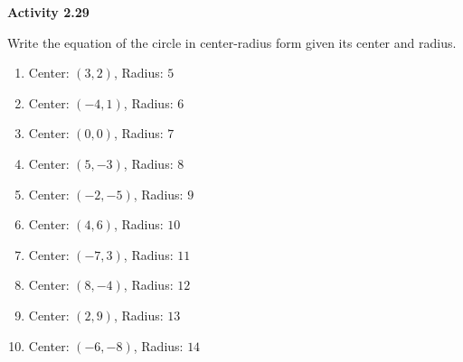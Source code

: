 \vspace{0.3ex}
\noindent\textbf{Activity 2.29}

\vspace{0.2ex}

Write the equation of the circle in center-radius form given its center and radius.
\begin{multicols}{2}
\begin{enumerate}
    \item Center: $(3,2)$, Radius: $5$
    \item Center: $(-4,1)$, Radius: $6$
    \item Center: $(0,0)$, Radius: $7$
    \item Center: $(5,-3)$, Radius: $8$
    \item Center: $(-2,-5)$, Radius: $9$
    \item Center: $(4,6)$, Radius: $10$
    \item Center: $(-7,3)$, Radius: $11$
    \item Center: $(8,-4)$, Radius: $12$
    \item Center: $(2,9)$, Radius: $13$
    \item Center: $(-6,-8)$, Radius: $14$
\end{enumerate}
\end{multicols}
